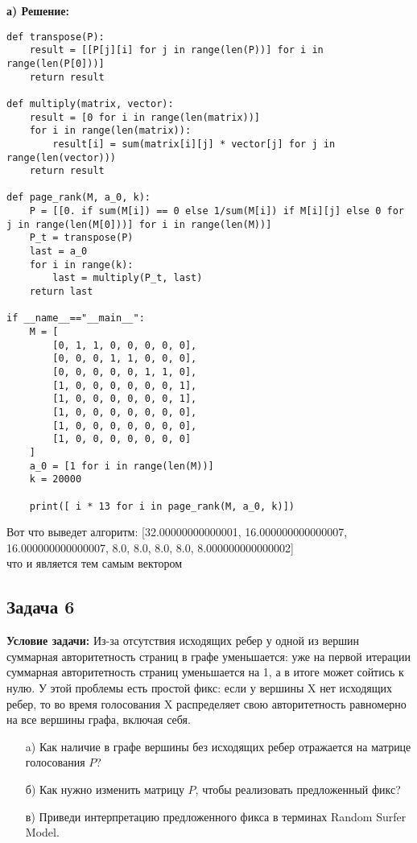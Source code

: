 \documentclass[a4paper,12pt]{article}
\begin{document}
\textbf{а) Решение:}
\begin{verbatim}
def transpose(P):
    result = [[P[j][i] for j in range(len(P))] for i in range(len(P[0]))]
    return result

def multiply(matrix, vector):
    result = [0 for i in range(len(matrix))]
    for i in range(len(matrix)):
        result[i] = sum(matrix[i][j] * vector[j] for j in range(len(vector)))
    return result

def page_rank(M, a_0, k):
    P = [[0. if sum(M[i]) == 0 else 1/sum(M[i]) if M[i][j] else 0 for j in range(len(M[0]))] for i in range(len(M))]
    P_t = transpose(P)
    last = a_0
    for i in range(k):
        last = multiply(P_t, last)
    return last

if __name__=="__main__":
    M = [
        [0, 1, 1, 0, 0, 0, 0, 0],
        [0, 0, 0, 1, 1, 0, 0, 0],
        [0, 0, 0, 0, 0, 1, 1, 0],
        [1, 0, 0, 0, 0, 0, 0, 1],
        [1, 0, 0, 0, 0, 0, 0, 1],
        [1, 0, 0, 0, 0, 0, 0, 0],
        [1, 0, 0, 0, 0, 0, 0, 0],
        [1, 0, 0, 0, 0, 0, 0, 0]
    ]
    a_0 = [1 for i in range(len(M))]
    k = 20000

    print([ i * 13 for i in page_rank(M, a_0, k)])
\end{verbatim}
Вот что выведет алгоритм: [32.00000000000001, 16.000000000000007, 16.000000000000007, 8.0, 8.0, 8.0, 8.0, 8.000000000000002]\\
что и является тем самым вектором
\vspace{1cm}
\subsection{Задача 6}
\textbf{Условие задачи:}
Из-за отсутствия исходящих ребер у одной из вершин суммарная авторитетность страниц в графе уменьшается: уже на первой итерации суммарная авторитетность страниц уменьшается на 1, а в итоге может сойтись к нулю. У этой проблемы есть простой фикс: если у вершины X нет исходящих ребер, то во время голосования X распределяет свою авторитетность равномерно на все вершины графа, включая себя.

\begin{itemize}
    \item[a)] Как наличие в графе вершины без исходящих ребер отражается на матрице голосования \(P\)?
    \item[б)] Как нужно изменить матрицу \(P\), чтобы реализовать предложенный фикс?
    \item[в)] Приведи интерпретацию предложенного фикса в терминах Random Surfer Model.
\end{itemize}
\end{document}
